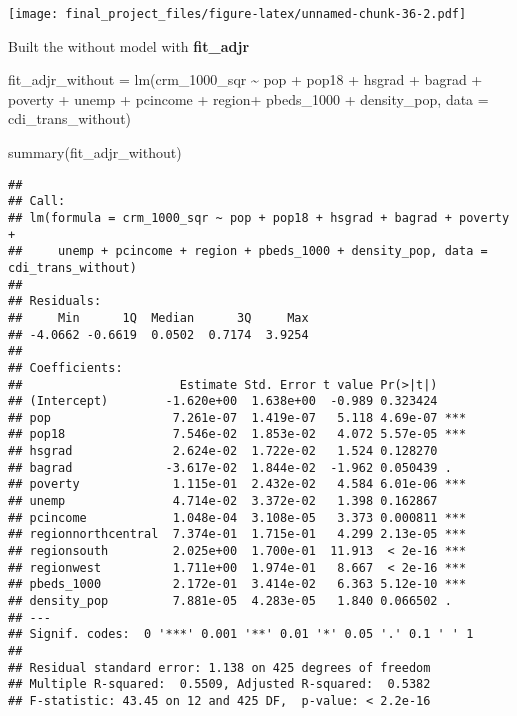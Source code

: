 \documentclass[
]{article}
\newenvironment{Shaded}{\begin{snugshade}}{\end{snugshade}}
\newcommand{\AttributeTok}[1]{\textcolor[rgb]{0.77,0.63,0.00}{#1}}
\newcommand{\FunctionTok}[1]{\textcolor[rgb]{0.00,0.00,0.00}{#1}}
\newcommand{\NormalTok}[1]{#1}
\newcommand{\OtherTok}[1]{\textcolor[rgb]{0.56,0.35,0.01}{#1}}
\newcommand{\SpecialCharTok}[1]{\textcolor[rgb]{0.00,0.00,0.00}{#1}}
\begin{document}
\texttt{[image: final\_project\_files/figure-latex/unnamed-chunk-36-2.pdf]}

Built the without model with \textbf{fit\_adjr}

\begin{Shaded}
\begin{Highlighting}[]
\NormalTok{fit\_adjr\_without }\OtherTok{=} \FunctionTok{lm}\NormalTok{(crm\_1000\_sqr }\SpecialCharTok{\textasciitilde{}}\NormalTok{ pop }\SpecialCharTok{+}\NormalTok{ pop18 }\SpecialCharTok{+}\NormalTok{ hsgrad }\SpecialCharTok{+}\NormalTok{ bagrad }\SpecialCharTok{+}\NormalTok{ poverty }\SpecialCharTok{+}\NormalTok{ unemp }\SpecialCharTok{+}\NormalTok{ pcincome }\SpecialCharTok{+}\NormalTok{ region}\SpecialCharTok{+}\NormalTok{ pbeds\_1000 }\SpecialCharTok{+}\NormalTok{ density\_pop, }\AttributeTok{data =}\NormalTok{ cdi\_trans\_without)}

\FunctionTok{summary}\NormalTok{(fit\_adjr\_without)}
\end{Highlighting}
\end{Shaded}

\begin{verbatim}
## 
## Call:
## lm(formula = crm_1000_sqr ~ pop + pop18 + hsgrad + bagrad + poverty + 
##     unemp + pcincome + region + pbeds_1000 + density_pop, data = cdi_trans_without)
## 
## Residuals:
##     Min      1Q  Median      3Q     Max 
## -4.0662 -0.6619  0.0502  0.7174  3.9254 
## 
## Coefficients:
##                      Estimate Std. Error t value Pr(>|t|)    
## (Intercept)        -1.620e+00  1.638e+00  -0.989 0.323424    
## pop                 7.261e-07  1.419e-07   5.118 4.69e-07 ***
## pop18               7.546e-02  1.853e-02   4.072 5.57e-05 ***
## hsgrad              2.624e-02  1.722e-02   1.524 0.128270    
## bagrad             -3.617e-02  1.844e-02  -1.962 0.050439 .  
## poverty             1.115e-01  2.432e-02   4.584 6.01e-06 ***
## unemp               4.714e-02  3.372e-02   1.398 0.162867    
## pcincome            1.048e-04  3.108e-05   3.373 0.000811 ***
## regionnorthcentral  7.374e-01  1.715e-01   4.299 2.13e-05 ***
## regionsouth         2.025e+00  1.700e-01  11.913  < 2e-16 ***
## regionwest          1.711e+00  1.974e-01   8.667  < 2e-16 ***
## pbeds_1000          2.172e-01  3.414e-02   6.363 5.12e-10 ***
## density_pop         7.881e-05  4.283e-05   1.840 0.066502 .  
## ---
## Signif. codes:  0 '***' 0.001 '**' 0.01 '*' 0.05 '.' 0.1 ' ' 1
## 
## Residual standard error: 1.138 on 425 degrees of freedom
## Multiple R-squared:  0.5509, Adjusted R-squared:  0.5382 
## F-statistic: 43.45 on 12 and 425 DF,  p-value: < 2.2e-16
\end{verbatim}
\end{document}
